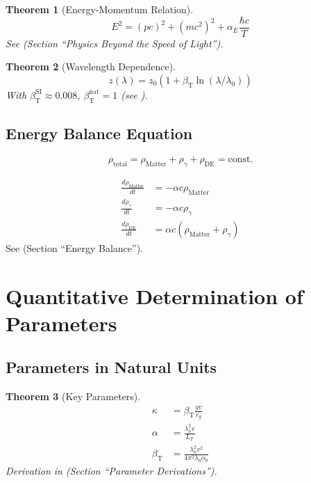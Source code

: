 \documentclass[a4paper,12pt]{article}
\newtheorem{theorem}{Theorem}[section]
\theoremstyle{definition}
\theoremstyle{remark}
\newcommand{\betaT}{\beta_{\text{T}}}
\begin{document}
	\begin{theorem}[Energy-Momentum Relation]
		\begin{equation}
			E^2 = (p c)^2 + (m c^2)^2 + \alpha_E \frac{\hbar c}{T}
		\end{equation}
		See \cite{pascher_photons_2025} (Section “Physics Beyond the Speed of Light”).
	\end{theorem}
	
	\begin{theorem}[Wavelength Dependence]
		\begin{equation}
			z(\lambda) = z_0 (1 + \betaT \ln(\lambda/\lambda_0))
		\end{equation}
		With \(\betaT^{\text{SI}} \approx 0.008\), \(\betaT^{\text{nat}} = 1\) (see \cite{pascher_params_2025}).
	\end{theorem}
	
	\subsection{Energy Balance Equation}
	
	\begin{equation}
		\rho_{\text{total}} = \rho_{\text{Matter}} + \rho_{\gamma} + \rho_{\text{DE}} = \text{const.}
	\end{equation}
	
	\begin{align}
		\frac{d \rho_{\text{Matter}}}{d t} &= -\alpha c \rho_{\text{Matter}} \\
		\frac{d \rho_{\gamma}}{d t} &= -\alpha c \rho_{\gamma} \\
		\frac{d \rho_{\text{DE}}}{d t} &= \alpha c (\rho_{\text{Matter}} + \rho_{\gamma})
	\end{align}
	See \cite{pascher_messdifferenzen_2025} (Section “Energy Balance”).
	
	\section{Quantitative Determination of Parameters}
	
	\subsection{Parameters in Natural Units}
	
	\begin{theorem}[Key Parameters]
		\begin{align}
			\kappa &= \betaT \frac{y v}{r_g} \\
			\alpha &= \frac{\lambda_h^2 v}{L_T} \\
			\betaT &= \frac{\lambda_h^2 v^2}{4\pi^2 \lambda_0 \alpha_0}
		\end{align}
		Derivation in \cite{pascher_params_2025} (Section “Parameter Derivations”).
	\end{theorem}
	
\end{document}
